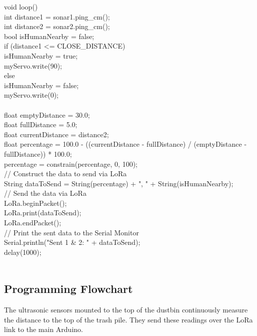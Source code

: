 \documentclass[conference, onecolumn]{IEEEtran}
\begin{document}
void loop() {\\
  int distance1 = sonar1.ping_cm();\\
  int distance2 = sonar2.ping_cm();\\

  bool isHumanNearby = false;\\
  if (distance1 <= CLOSE_DISTANCE) {\\
    isHumanNearby = true;\\
    myServo.write(90);\\
  } else {\\
    isHumanNearby = false;\\
    myServo.write(0);\\
  }\\

  float emptyDistance = 30.0;\\
  float fullDistance = 5.0;\\
  float currentDistance = distance2;\\
  float percentage = 100.0 - ((currentDistance - fullDistance) / (emptyDistance - fullDistance)) * 100.0;\\
  percentage = constrain(percentage, 0, 100);\\

  // Construct the data to send via LoRa\\
  String dataToSend = String(percentage) + ", " + String(isHumanNearby);\\
  
  // Send the data via LoRa\\
  LoRa.beginPacket();\\
  LoRa.print(dataToSend);\\
  LoRa.endPacket();\\
  
  // Print the sent data to the Serial Monitor\\
  Serial.println("Sent 1 & 2: " + dataToSend);\\
  
  delay(1000);\\
}\\




\subsection{Programming Flowchart}
The ultrasonic sensors mounted to the top of the dustbin continuously measure the distance to the top of the trash pile. They send these readings over the LoRa link to the main Arduino.
\end{document}
